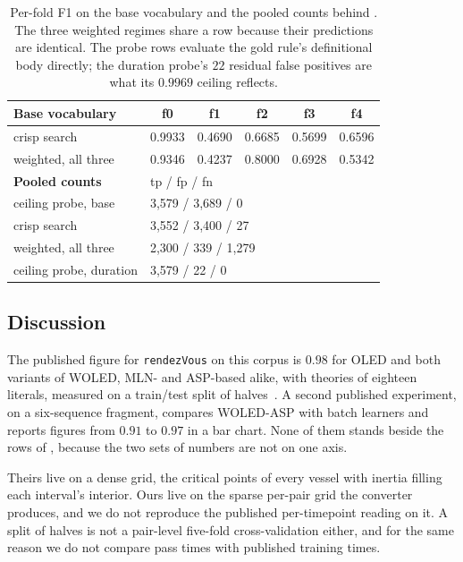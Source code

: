 \begin{table}[t]
  \centering
  \small
  \setlength{\tabcolsep}{2pt}
  \begin{tabular}{@{}lccccc@{}}
    \toprule
    \textbf{Base vocabulary} & \textbf{f0} & \textbf{f1} & \textbf{f2} & \textbf{f3} & \textbf{f4}\\
    \midrule
    crisp search & 0.9933 & 0.4690 & 0.6685 & 0.5699 & 0.6596\\
    weighted, all three & 0.9346 & 0.4237 & 0.8000 & 0.6928 & 0.5342\\
    \midrule
    \textbf{Pooled counts} & \multicolumn{5}{l}{tp / fp / fn}\\
    \midrule
    ceiling probe, base & \multicolumn{5}{l}{3{,}579 / 3{,}689 / 0}\\
    crisp search & \multicolumn{5}{l}{3{,}552 / 3{,}400 / 27}\\
    weighted, all three & \multicolumn{5}{l}{2{,}300 / 339 / 1{,}279}\\
    ceiling probe, duration & \multicolumn{5}{l}{3{,}579 / 22 / 0}\\
    \bottomrule
  \end{tabular}
  \caption{Per-fold F1 on the base vocabulary and the pooled counts behind . The three weighted regimes share a row because their predictions are identical. The probe rows evaluate the gold rule's definitional body directly; the duration probe's $22$ residual false positives are what its $0.9969$ ceiling reflects.}
  \label{tab:maritime-folds}
\end{table}

\subsection{Discussion}\label{subsec:maritime-comparison}

The published figure for \texttt{rendezVous} on this corpus is $0.98$ for OLED and both variants of WOLED, MLN- and ASP-based alike, with theories of eighteen literals, measured on a train/test split of halves~\cite{woled}. A second published experiment, on a six-sequence fragment, compares WOLED-ASP with batch learners and reports figures from $0.91$ to $0.97$ in a bar chart. None of them stands beside the rows of , because the two sets of numbers are not on one axis.

Theirs live on a dense grid, the critical points of every vessel with inertia filling each interval's interior. Ours live on the sparse per-pair grid the converter produces, and we do not reproduce the published per-timepoint reading on it. A split of halves is not a pair-level five-fold cross-validation either, and for the same reason we do not compare pass times with published training times.


